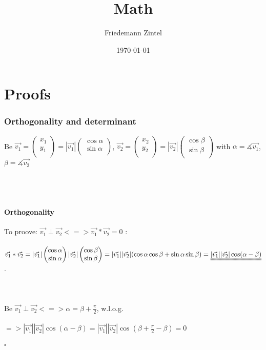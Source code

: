 \documentclass[a4paper]{article}
\title{Math}
\author{Friedemann Zintel}
\date{\today}
\newcommand*{\vecdd}[2]{\begin{pmatrix}#1\\#2\\\end{pmatrix}}
\begin{document}
\tableofcontents
\newpage
\part{Proofs}
\section{Orthogonality and determinant}
Be $\vec{v_1}=\vecdd{x_1}{y_1}=|\vec{v_1}|\vecdd{\cos\alpha}{\sin\alpha}$, $\vec{v_2}=\vecdd{x_2}{y_2}=|\vec{v_2}|\vecdd{\cos\beta}{\sin\beta}$
with $\alpha=\measuredangle\vec{v_1}$, $\beta=\measuredangle\vec{v_2}$
\\\\\\\\
\subsection*{Orthogonality}
To proove: $\vec{v_1}\perp \vec{v_2} <=> \vec{v_1}*\vec{v_2}=0$ :\\\\
$\vec{v_1}*\vec{v_2}
=|\vec{v_1}|\vecdd{\cos\alpha}{\sin\alpha}|\vec{v_2}|\vecdd{\cos\beta}{\sin\beta}
=|\vec{v_1}||\vec{v_2}|(\cos\alpha\cos\beta+\sin\alpha\sin\beta)=\uuline{|\vec{v_1}||\vec{v_2}|\cos(\alpha-\beta)}$.
\\\\\\\\
Be $\vec{v_1}\perp \vec{v_2} <=> \alpha=\beta+\frac{\pi}{2}$, w.l.o.g.
\\\\
$=>|\vec{v_1}||\vec{v_2}|\cos(\alpha-\beta)=|\vec{v_1}||\vec{v_2}|\cos(\beta+\frac{\pi}{2}-\beta)=0$
\\\\$\square$
\end{document}

